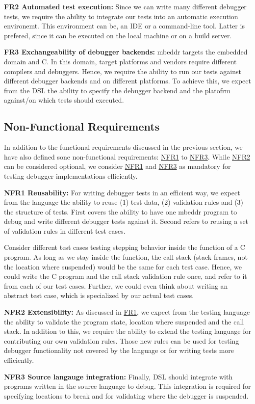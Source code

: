 \noindent \textbf{\label{FR2}FR2 Automated test execution:} Since we can write
many different debugger tests, we require the ability to integrate our 
tests into an automatic execution environemt. This environment can be, \eg
an \ac{IDE} or a command-line tool. Latter is prefered, since it can be
executed on the local machine or on a build server.

\noindent \textbf{\label{FR3}FR3 Exchangeability of debugger backends:}
mbeddr targets the embedded domain and C. In this domain, target platforms and
vendors require different compilers and debuggers. 
Hence, we require the ability to run our tests against
different debugger backends and on different platforms. To achieve this,
we expect from the \ac{DSL} the ability to specify the debugger backend
and the platofrm against/on which tests should executed.

\subsection{Non-Functional Requirements}

In addition to the functional requirements discussed in the previous section, we
have also defined sone non-functional requirements: \hyperref[NFR1]{NFR1} to
\hyperref[NFR3]{NFR3}. While \hyperref[NFR2]{NFR2} can be considered optional,
we consider \hyperref[NFR1]{NFR1} and \hyperref[NFR3]{NFR3} as mandatory for
testing debugger implementations efficiently.

\noindent \textbf{\label{NFR1}NFR1 Reusability:} For writing debugger tests in
an efficient way, we expect from the language the ability to reuse (1) test data, (2) 
validation rules and (3) the structure of tests. First covers the ability to
have one mbeddr program to debug and write different debugger tests against
it. Second refers to reusing a set of validation rules in different test cases.

Consider different test cases testing stepping behavior inside the  
function of a C program.
As long as we stay inside the function, the call stack (stack frames, not the
location where suspended) would be the same for each test case. Hence, we could
write the C program and the call stack validation rule once, and refer to it
from each of our test cases. Further, we could even think about writing
an abstract test case, which is specialized by our actual test cases.


\noindent \textbf{\label{NFR2}NFR2 Extensibility:} As discussed in
\hyperref[FR1]{FR1}, 
we expect from the testing language the ability to validate the program state, location where
suspended and the call stack. In addition to this, we
require the ability to extend the testing language for contributing our own
validation rules. Those new rules can be used for testing debugger
functionality not covered by the language or for writing tests more efficiently.

\noindent \textbf{\label{NFR3}NFR3 Source langauge integration:} Finally,
\ac{DSL} should integrate with programs written in the source language to debug.
This integration is required for specifying locations to break and for
validating where the debugger is suspended.
